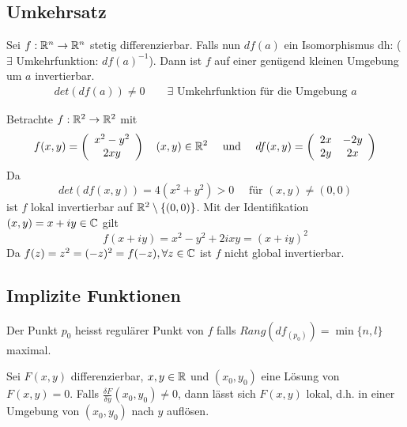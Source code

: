 \documentclass[a4paper]{article}
\begin{document}
	\newpage
	\subsection{Umkehrsatz}
		\begin{fsatz}
			Sei $f: \mathbb{R}^n \rightarrow \mathbb{R}^n$ stetig differenzierbar. Falls nun $df(a)$ ein Isomorphismus dh: ($\exists$ Umkehrfunktion: $df(a)^{-1}$). Dann ist $f$ auf einer genügend kleinen Umgebung um $a$ invertierbar.
			\begin{align*}
				det(df(a)) \neq 0 \qquad \exists \text{ Umkehrfunktion für die Umgebung }a
			\end{align*}

		\end{fsatz}

		\begin{fmerke}[BSP]
			Betrachte $f: \mathbb{R}^2 \rightarrow \mathbb{R}^2$ mit 
				$$f(x,y) = \left( \begin{array}{c} 
																		x^2- y^2 \\
																		2xy
																	\end{array} \right) \quad (x,y) \in \mathbb{R}^2
			\quad \text{ und } \quad
				df(x,y) = \left( \begin{array}{cc}
									2x & -2y \\
									2y & 2x
								\end{array} \right)$$
			Da 
				$$det(df(x,y)) = 4(x^2+y^2) > 0
			\quad \text{ für } (x,y) \neq (0,0)$$ 
			ist $f$ lokal invertierbar auf $\mathbb{R}^2 \setminus \{(0,0)\}$. Mit der Identifikation $(x,y) = x + iy \in \mathbb{C}$ gilt
			$$f(x+iy) = x^2-y^2 + 2ixy = (x+iy)^2$$ Da $f(z) = z^2 = (-z)^2 = f(-z), \forall z \in \mathbb{C}$ ist $f$ nicht global invertierbar.
		\end{fmerke}
			
	\subsection{Implizite Funktionen}
		\begin{fdef}
			Der Punkt $p_0$ heisst regulärer Punkt von $f$ falls $Rang(df_{(p_0)}) = \min\{ n,l \}$ maximal.
		\end{fdef}
			
		\begin{fsatz}
			Sei $F(x,y)$ differenzierbar, $x,y \in \mathbb{R}$ und $(x_0,y_0)$ eine Lösung von $F(x,y)=0$. Falls $\frac{\delta F}{\delta y}(x_0,y_0)\neq 0$, dann lässt sich $F(x,y)$ lokal, d.h. in einer Umgebung von $(x_0,y_0)$ nach $y$ auflösen.
		\end{fsatz}
\end{document}
